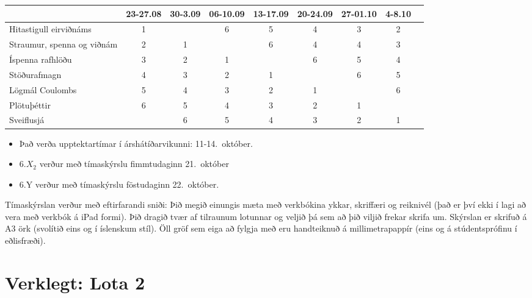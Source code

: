 \begin{table}[H]
    \centering
    \begin{tabular}{|l||c|c|c|c|c|c|c|c|}
    \hline 
         & 23-27.08 & 30-3.09 & 06-10.09 & 13-17.09 & 20-24.09 & 27-01.10 & 4-8.10    \\ \hline \hline
        Hitastigull eirviðnáms & 1 &  & 6 & 5 & 4 & 3 & 2  \\ \hline
        Straumur, spenna og viðnám & 2 & 1 &  & 6 & 4 & 4 & 3 \\ \hline
        Íspenna rafhlöðu & 3 & 2 & 1 &  & 6 & 5 & 4 \\ \hline
        Stöðurafmagn & 4 & 3 & 2 & 1 &  & 6 & 5 \\ \hline
        Lögmál Coulombs & 5 & 4 & 3 & 2 & 1 &  & 6 \\ \hline
        Plötuþéttir & 6 & 5 & 4 & 3 & 2 & 1 & \\ \hline
        Sveiflusjá &  & 6 & 5 & 4 & 3 & 2 & 1 \\ \hline
    \end{tabular}
\end{table}


\begin{itemize}
    \item Það verða upptektartímar í árshátíðarvikunni: 11-14.~október.
    \item 6.$X_2$ verður með tímaskýrslu fimmtudaginn 21.~október
    \item 6.Y verður með tímaskýrslu föstudaginn 22.~október.
\end{itemize}

Tímaskýrslan verður með eftirfarandi sniði: Þið megið einungis mæta með verkbókina ykkar, skriffæri og reiknivél (það er því ekki í lagi að vera með verkbók á iPad formi). Þið dragið tvær af tilraunum lotunnar og veljið þá sem að þið viljið frekar skrifa um. Skýrslan er skrifuð á A3 örk (svolítið eins og í íslenskum stíl). Öll gröf sem eiga að fylgja með eru handteiknuð á millimetrapappír (eins og á stúdentsprófinu í eðlisfræði).


\newpage


\section*{Verklegt: Lota 2}

